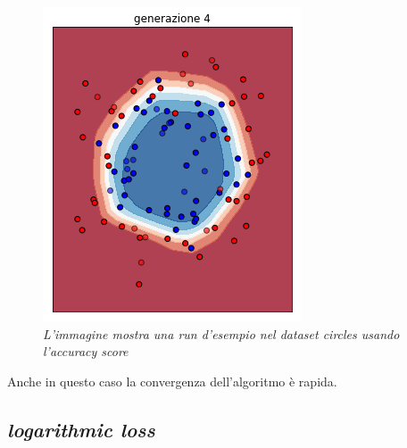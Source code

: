 \documentclass[12pt,a4paper]{report}
\begin{document}
\begin{figure}[H]
 \includegraphics[scale = 0.3]{images/circles-rnd-acc/4}
 \caption{\textit{L'immagine mostra una run d'esempio nel dataset circles usando l'accuracy score}}
 \label{circles1}
\end{figure}

Anche in questo caso la convergenza dell'algoritmo è rapida.

\subsection{\textit{logarithmic loss}}
\end{document}
